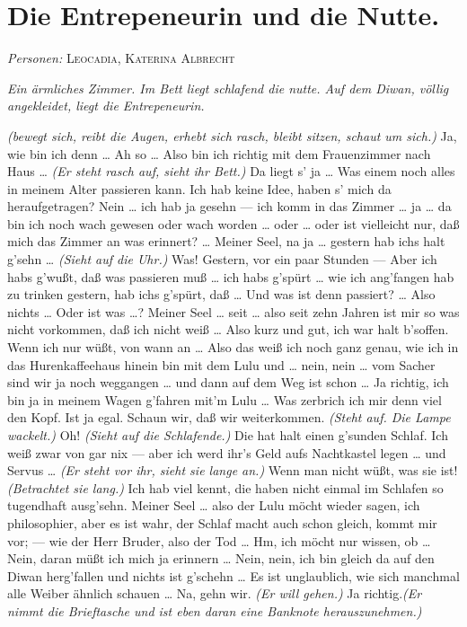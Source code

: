 \documentclass[
	final,
	a4paper,
	ngerman,
	mpinclude = true, %
	twoside = true,
	open = right,
	cleardoublepage = plain,
	DIV = 13,
	BCOR = 1cm,
	titlepage = firstiscover,
	]{scrbook}
\newcommand{\scene}{\section}
\newcommand{\direction}[1]{\textit{(#1)}}
\newcommand{\setting}[1]{\vspace{-0.5\baselineskip}\centering\textit{#1}}
\newcommand{\characterlist}[1]{{\begin{center}\textit{Personen:} #1\end{center}}}
\newcommand{\thecharacter}[1]{\textup{\textsc{#1}}\xspace}
\newcommand{\thenutte}{\thecharacter{Leocadia}}
\newcommand{\theentrepeneurin}{\thecharacter{Katerina Albrecht}}
\newcommand{\character}[1]{\item[#1:]}
\newcommand{\entrepeneurin}{\character{\theentrepeneurin}}
\begin{document}
\scene{Die Entrepeneurin und die Nutte.}
\characterlist{\thenutte, \theentrepeneurin}
\setting{Ein ärmliches Zimmer. Im Bett liegt schlafend die nutte. Auf dem Diwan, völlig angekleidet, liegt die Entrepeneurin.}
\begin{play}
	\entrepeneurin
	\direction{bewegt sich, reibt die Augen, erhebt sich rasch, bleibt sitzen, schaut um sich.} Ja, wie bin ich denn \ldots{} Ah so \ldots{} Also bin ich richtig mit dem Frauenzimmer nach Haus \ldots{} \direction{Er steht rasch auf, sieht ihr Bett.} Da liegt s' ja \ldots{} Was einem noch alles in meinem Alter passieren kann. Ich hab keine Idee, haben s' mich da heraufgetragen? Nein \ldots{} ich hab ja gesehn --- ich komm in das Zimmer \ldots{} ja \ldots{} da bin ich noch wach gewesen oder wach worden \ldots{} oder \ldots{} oder ist vielleicht nur, daß mich das Zimmer an was erinnert? \ldots{} Meiner Seel, na ja \ldots{} gestern hab ichs halt g'sehn \ldots{} \direction{Sieht auf die Uhr.} Was! Gestern, vor ein paar Stunden --- Aber ich habs g'wußt, daß was passieren muß \ldots{} ich habs g'spürt \ldots{} wie ich ang'fangen hab zu trinken gestern, hab ichs g'spürt, daß \ldots{} Und was ist denn passiert? \ldots{} Also nichts \ldots{} Oder ist was \ldots{}? Meiner Seel \ldots{} seit \ldots{} also seit zehn Jahren ist mir so was nicht vorkommen, daß ich nicht weiß \ldots{} Also kurz und gut, ich war halt b'soffen. Wenn ich nur wüßt, von wann an \ldots{} Also das weiß ich noch ganz genau, wie ich in das Hurenkaffeehaus hinein bin mit dem Lulu und \ldots{} nein, nein \ldots{} vom Sacher sind wir ja noch weggangen \ldots{} und dann auf dem Weg ist schon \ldots{} Ja richtig, ich bin ja in meinem Wagen g'fahren mit'm Lulu \ldots{} Was zerbrich ich mir denn viel den Kopf. Ist ja egal. Schaun wir, daß wir weiterkommen. \direction{Steht auf. Die Lampe wackelt.} Oh! \direction{Sieht auf die Schlafende.} Die hat halt einen g'sunden Schlaf. Ich weiß zwar von gar nix --- aber ich werd ihr's Geld aufs Nachtkastel legen \ldots{} und Servus \ldots{} \direction{Er steht vor ihr, sieht sie lange an.} Wenn man nicht wüßt, was sie ist! \direction{Betrachtet sie lang.} Ich hab viel kennt, die haben nicht einmal im Schlafen so tugendhaft ausg'sehn. Meiner Seel \ldots{} also der Lulu möcht wieder sagen, ich philosophier, aber es ist wahr, der Schlaf macht auch schon gleich, kommt mir vor; --- wie der Herr Bruder, also der Tod \ldots{} Hm, ich möcht nur wissen, ob \ldots{} Nein, daran müßt ich mich ja erinnern \ldots{} Nein, nein, ich bin gleich da auf den Diwan herg'fallen und nichts ist g'schehn \ldots{} Es ist unglaublich, wie sich manchmal alle Weiber ähnlich schauen \ldots{} Na, gehn wir. \direction{Er will gehen.} Ja richtig.\direction{Er nimmt die Brieftasche und ist eben daran eine Banknote herauszunehmen.}


\end{play}
\end{document}
